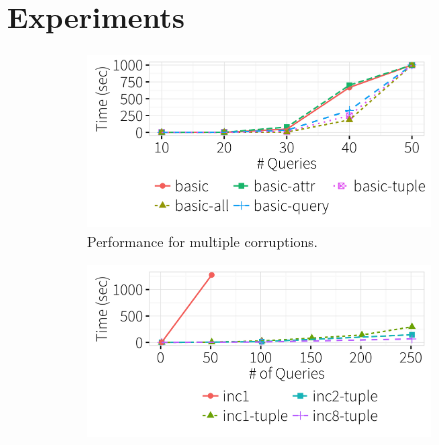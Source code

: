 
%
%
%
%
%
\section{Experiments}
\label{sec:experiments}


  \begin{figure}[h]
  \hspace*{-.1in}
  \centering
    \vspace*{-.2in}
    \begin{subfigure}[t]{.33\textwidth}
    \includegraphics[width = .99\columnwidth]{figures/multi_time}
    \vspace*{-.25in}
    \caption{Performance for multiple corruptions.}
    \label{f:multi_time} 
    \end{subfigure}
    \begin{subfigure}[t]{.33\textwidth}
    \includegraphics[width = .99\columnwidth]{figures/incrementalcompare_time}
    \vspace*{-.25in}

\end{subfigure}
\end{figure}
